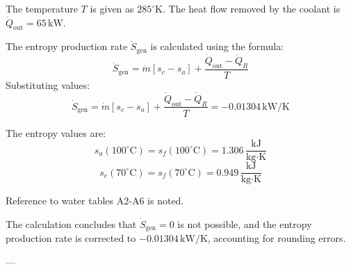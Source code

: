 The temperature \( T \) is given as \( 285^\circ \text{K} \). The heat flow removed by the coolant is \( \dot{Q}_{\text{out}} = 65 \, \text{kW} \).  

The entropy production rate \( \dot{S}_{\text{gen}} \) is calculated using the formula:  
\[
\dot{S}_{\text{gen}} = \dot{m} \left[ s_c - s_a \right] + \frac{\dot{Q}_{\text{out}} - \dot{Q}_R}{T}
\]  
Substituting values:  
\[
\dot{S}_{\text{gen}} = \dot{m} \left[ s_c - s_a \right] + \frac{\dot{Q}_{\text{out}} - \dot{Q}_R}{T} = -0.01304 \, \text{kW/K}
\]  

The entropy values are:  
\[
s_a(100^\circ \text{C}) = s_f(100^\circ \text{C}) = 1.306 \, \frac{\text{kJ}}{\text{kg·K}}
\]  
\[
s_e(70^\circ \text{C}) = s_f(70^\circ \text{C}) = 0.949 \, \frac{\text{kJ}}{\text{kg·K}}
\]  

Reference to water tables \( \text{A2-A6} \) is noted.  

The calculation concludes that \( \dot{S}_{\text{gen}} = 0 \) is not possible, and the entropy production rate is corrected to \( -0.01304 \, \text{kW/K} \), accounting for rounding errors.  

---